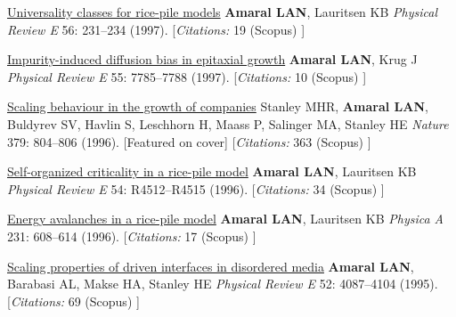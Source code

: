 \NumberedItem{\makebox[0.8cm][r]{[12]}}
\href{/people/amaral/universality-classes-for-rice-pile-models}
{Universality classes for rice-pile models}
\newline
{\textbf{Amaral LAN}}, Lauritsen KB
\newline
\textit{Physical Review E}
    56:
231--234 (1997).
    [{\em{Citations:}}  19 (Scopus) ]
\newline
\Gap
~
\Gap

\NumberedItem{\makebox[0.8cm][r]{[11]}}
\href{/people/amaral/impurity-induced-diffusion-bias-in-epitaxial-growth}
{Impurity-induced diffusion bias in epitaxial growth}
\newline
{\textbf{Amaral LAN}}, Krug J
\newline
\textit{Physical Review E}
    55:
7785--7788 (1997).
    [{\em{Citations:}}  10 (Scopus) ]
\newline
\Gap
~
\Gap

\NumberedItem{\makebox[0.8cm][r]{[10]}}
\href{/people/amaral/scaling-behaviour-in-the-growth-of-companies}
{Scaling behaviour in the growth of companies}
\newline
Stanley MHR, {\textbf{Amaral LAN}}, Buldyrev SV, Havlin S, Leschhorn H, Maass P, Salinger MA, Stanley HE
\newline
\textit{Nature}
    379:
804--806 (1996).
    [Featured on cover]
    [{\em{Citations:}}  363 (Scopus) ]
\newline
\Gap
~
\Gap

\NumberedItem{\makebox[0.8cm][r]{[9]}}
\href{/people/amaral/self-organized-critically-in-a-rice-pile-model}
{Self-organized criticality in a rice-pile model}
\newline
{\textbf{Amaral LAN}}, Lauritsen KB
\newline
\textit{Physical Review E}
    54:
R4512--R4515 (1996).
    [{\em{Citations:}}  34 (Scopus) ]
\newline
\Gap
~
\Gap

\NumberedItem{\makebox[0.8cm][r]{[8]}}
\href{/people/amaral/energy-avalanches-in-a-rice-pile-model}
{Energy avalanches in a rice-pile model}
\newline
{\textbf{Amaral LAN}}, Lauritsen KB
\newline
\textit{Physica A}
    231:
608--614 (1996).
    [{\em{Citations:}}  17 (Scopus) ]
\newline
\Gap
~
\Gap

\NumberedItem{\makebox[0.8cm][r]{[7]}}
\href{/people/amaral/scaling-properties-of-driven-interfaces-in-disordered-media}
{Scaling properties of driven interfaces in disordered media}
\newline
{\textbf{Amaral LAN}}, Barabasi AL, Makse HA, Stanley HE
\newline
\textit{Physical Review E}
    52:
4087--4104 (1995).
    [{\em{Citations:}}  69 (Scopus) ]
\newline
\Gap
~
\Gap

